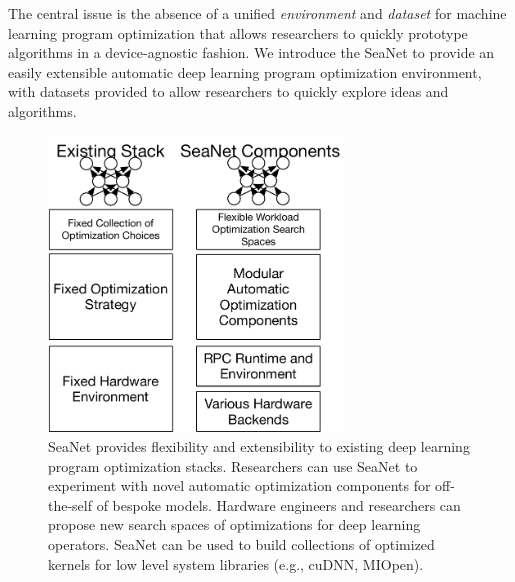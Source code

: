 The central issue is the absence of a unified \emph{environment} and \emph{dataset} for machine learning program optimization that allows researchers to quickly prototype algorithms in a device-agnostic fashion.
We introduce the SeaNet to provide an easily extensible automatic deep learning program optimization environment, with datasets provided to allow researchers to quickly explore ideas and algorithms.
\begin{figure}[ht]
\includegraphics[width=0.7\textwidth]{sys_diagrams/overview2.pdf}
\caption{SeaNet provides flexibility and extensibility to existing deep learning program optimization stacks.
Researchers can use SeaNet to experiment with novel automatic optimization components for off-the-self of bespoke models. Hardware engineers and researchers can propose new search spaces of optimizations for deep learning operators. SeaNet can be used to build collections of optimized kernels for low level system libraries (e.g., cuDNN, MIOpen).}
\end{figure}


